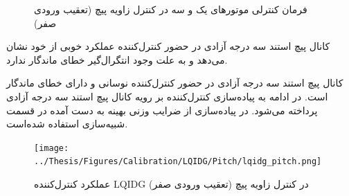 \documentclass{CCI2020}
\begin{document}

\begin{figure}[H]
	\centering
	
	\caption{فرمان کنترلی موتورهای یک و سه در کنترل زاویه پیچ (تعقیب ورودی صفر)}
\end{figure}
کانال پیچ استند سه درجه آزادی در حضور کنترل‌کننده  عملکرد خوبی از خود نشان می‌دهد و به علت وجود انتگرال‌گیر خطای ماندگار ندارد.



کانال پیچ استند سه درجه آزادی در حضور کنترل‌کننده  نوسانی و دارای خطای ماندگار است.
در ادامه به پیاده‌سازی کنترل‌کننده  بر رویه کانال پیچ استند سه درجه آزادی پرداخته می‌شود.
در پیاده‌سازی از ضرایب وزنی بهینه به دست آمده در قسمت شبیه‌سازی استفاده شده‌است.
\begin{figure}[H]
	\texttt{[image: ../Thesis/Figures/Calibration/LQIDG/Pitch/lqidg\_pitch.png]}
	\centering
	\caption{عملكرد کنترل‌کننده  LQIDG در کنترل زاويه پیچ (تعقیب ورودی صفر)}
\end{figure}

\end{document}
